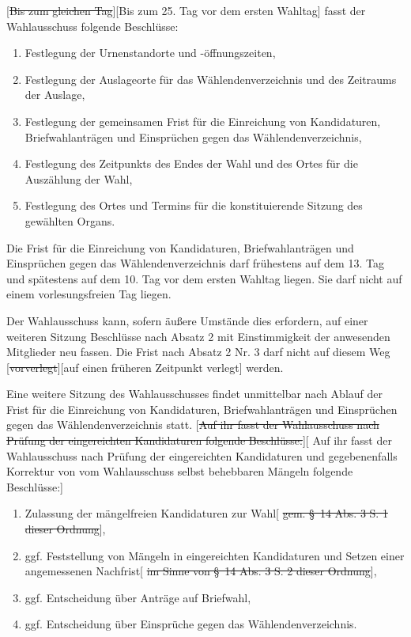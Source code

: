 \documentclass[%
draft,%
multilinesections%
]{fswo}
\newcommand\oldT[1]  {{\color{Gray}[\st{#1}]}}
\newcommand\newT[1]  {{\color{Green}[#1]}}
\newcommand\oldT[1]{}%
\newcommand\newT[1]{#1}
\newcommand\change[2]{\oldT{#1}\newT{#2}}
\begin{document}
\begin{contract}
\change{Bis zum gleichen Tag}{Bis zum 25. Tag vor dem ersten Wahltag} fasst der Wahlausschuss folgende Beschlüsse:
\begin{enumerate}
\item Festlegung der Urnenstandorte und -öffnungszeiten,
\item Festlegung der Auslageorte für das Wählendenverzeichnis und des Zeitraums der Auslage,
\item Festlegung der gemeinsamen Frist für die Einreichung von Kandidaturen, Briefwahlanträgen und Einsprüchen gegen das Wählendenverzeichnis,
\item Festlegung des Zeitpunkts des Endes der Wahl und des Ortes für die Auszählung der Wahl,
\item Festlegung des Ortes und Termins für die konstituierende Sitzung des gewählten Organs.
\end{enumerate}
Die Frist für die Einreichung von Kandidaturen, Briefwahlanträgen und Einsprüchen gegen das Wählendenverzeichnis darf frühestens auf dem 13. Tag und spätestens auf dem 10. Tag vor dem ersten Wahltag liegen.
Sie darf nicht auf einem vorlesungsfreien Tag liegen.

Der Wahlausschuss kann, sofern äußere Umstände dies erfordern, auf einer weiteren Sitzung Beschlüsse nach Absatz 2 mit Einstimmigkeit der anwesenden Mitglieder neu fassen.
Die Frist nach Absatz 2 Nr. 3 darf nicht auf diesem Weg \change{vorverlegt}{auf einen früheren Zeitpunkt verlegt} werden.

Eine weitere Sitzung des Wahlausschusses findet unmittelbar nach Ablauf der Frist für die Einreichung von Kandidaturen, Briefwahlanträgen und Einsprüchen gegen das Wählendenverzeichnis statt.
\change{Auf ihr fasst der Wahlausschuss nach Prüfung der eingereichten Kandidaturen folgende Beschlüsse:}{%
Auf ihr fasst der Wahlausschuss nach Prüfung der eingereichten Kandidaturen und gegebenenfalls Korrektur von vom Wahlausschuss selbst behebbaren Mängeln folgende Beschlüsse:}
\begin{enumerate}
\item Zulassung der mängelfreien Kandidaturen zur Wahl\oldT{ gem. \S~14 Abs. 3 S. 1 dieser Ordnung},
\item ggf. Feststellung von Mängeln in eingereichten Kandidaturen und Setzen einer angemessenen Nachfrist\oldT{ im Sinne von \S~14 Abs. 3 S. 2 dieser Ordnung},
\item ggf. Entscheidung über Anträge auf Briefwahl,
\item ggf. Entscheidung über Einsprüche gegen das Wählendenverzeichnis.
\end{enumerate}


\end{contract}
\end{document}
